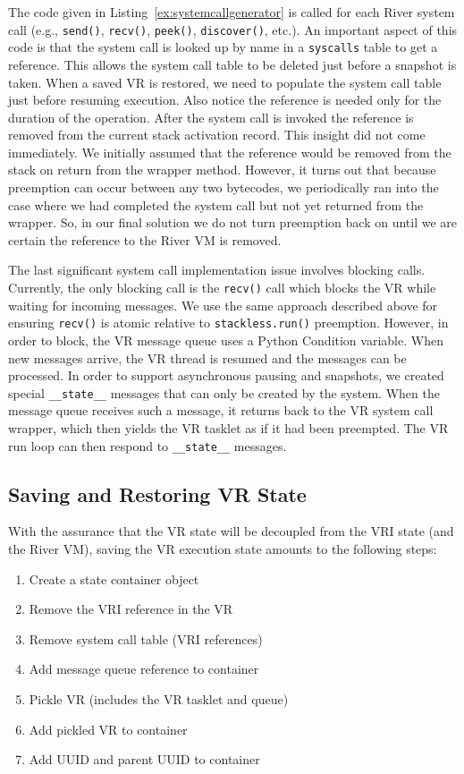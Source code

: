 The code given in Listing~\ref{ex:systemcallgenerator} is called for
each River system call (e.g., \verb+send()+, \verb+recv()+,
\verb+peek()+, \verb+discover()+, etc.). An important aspect of this code is that the system call is looked up by name in a \verb+syscalls+ table to get a reference.  This allows the system call table to be deleted just before a snapshot is taken.  When a saved VR is restored, we need to populate the system call table just before resuming execution.   Also notice the reference is needed only for the duration of the operation.  After the system call is invoked the reference is removed from the current stack activation record.  This insight did not come immediately.  We initially assumed that the reference would be removed from the stack on return from the wrapper method.  However, it turns out that because preemption can occur between any two bytecodes, we periodically ran into the case where we had completed the system call but not yet returned from the wrapper.  So, in our final solution we do not turn preemption back on until we are certain the reference to the River VM is removed.

The last significant system call implementation issue involves blocking
calls.  Currently, the only blocking call is the \verb+recv()+ call which
blocks the VR while waiting for incoming messages.  We use the same
approach described above for ensuring \verb+recv()+ is atomic relative to
\verb+stackless.run()+ preemption.  However, in order to block, the VR
message queue uses a Python Condition variable.  When new messages arrive,
the VR thread is resumed and the messages can be processed.  In order to
support asynchronous pausing and snapshots, we created special
\verb+__state__+ messages that can only be created by the system.  When the
message queue receives such a message, it returns back to the VR system call wrapper, which then yields the VR tasklet as if it had been preempted.  The VR run loop can then respond to \verb+__state__+ messages.  

\subsection{Saving and Restoring VR State}

With the assurance that the VR state will be decoupled from the VRI state (and the River VM), saving the VR execution state amounts to the following steps:

\begin{enumerate}
\item Create a state container object
\item Remove the VRI reference in the VR
\item Remove system call table (VRI references)
\item Add message queue reference to container
\item Pickle VR (includes the VR tasklet and queue)
\item Add pickled VR to container
\item Add UUID and parent UUID to container
\end{enumerate}


